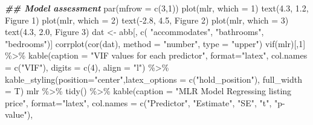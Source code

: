 \documentclass[
]{article}
\newenvironment{Shaded}{\begin{snugshade}}{\end{snugshade}}
\newcommand{\AttributeTok}[1]{\textcolor[rgb]{0.77,0.63,0.00}{#1}}
\newcommand{\DecValTok}[1]{\textcolor[rgb]{0.00,0.00,0.81}{#1}}
\newcommand{\DocumentationTok}[1]{\textcolor[rgb]{0.56,0.35,0.01}{\textbf{\textit{#1}}}}
\newcommand{\FloatTok}[1]{\textcolor[rgb]{0.00,0.00,0.81}{#1}}
\newcommand{\FunctionTok}[1]{\textcolor[rgb]{0.00,0.00,0.00}{#1}}
\newcommand{\NormalTok}[1]{#1}
\newcommand{\OtherTok}[1]{\textcolor[rgb]{0.56,0.35,0.01}{#1}}
\newcommand{\SpecialCharTok}[1]{\textcolor[rgb]{0.00,0.00,0.00}{#1}}
\newcommand{\StringTok}[1]{\textcolor[rgb]{0.31,0.60,0.02}{#1}}
\begin{document}
\begin{Shaded}
\begin{Highlighting}[]
\DocumentationTok{\#\# Model assessment}
\FunctionTok{par}\NormalTok{(}\AttributeTok{mfrow =} \FunctionTok{c}\NormalTok{(}\DecValTok{3}\NormalTok{,}\DecValTok{1}\NormalTok{))}
\FunctionTok{plot}\NormalTok{(mlr, }\AttributeTok{which =} \DecValTok{1}\NormalTok{)}
\FunctionTok{text}\NormalTok{(}\FloatTok{4.3}\NormalTok{, }\FloatTok{1.2}\NormalTok{, }\StringTok{\textquotesingle{}Figure 1\textquotesingle{}}\NormalTok{)}
\FunctionTok{plot}\NormalTok{(mlr, }\AttributeTok{which =} \DecValTok{2}\NormalTok{)}
\FunctionTok{text}\NormalTok{(}\SpecialCharTok{{-}}\FloatTok{2.8}\NormalTok{, }\FloatTok{4.5}\NormalTok{, }\StringTok{\textquotesingle{}Figure 2\textquotesingle{}}\NormalTok{)}
\FunctionTok{plot}\NormalTok{(mlr, }\AttributeTok{which =} \DecValTok{3}\NormalTok{)}
\FunctionTok{text}\NormalTok{(}\FloatTok{4.3}\NormalTok{, }\FloatTok{2.0}\NormalTok{, }\StringTok{\textquotesingle{}Figure 3\textquotesingle{}}\NormalTok{)}
\NormalTok{dat }\OtherTok{\textless{}{-}}\NormalTok{ abb[, }\FunctionTok{c}\NormalTok{( }\StringTok{"accommodates"}\NormalTok{, }\StringTok{"bathrooms"}\NormalTok{,  }\StringTok{"bedrooms"}\NormalTok{)]}
\FunctionTok{corrplot}\NormalTok{(}\FunctionTok{cor}\NormalTok{(dat), }\AttributeTok{method =} \StringTok{"number"}\NormalTok{, }\AttributeTok{type =} \StringTok{"upper"}\NormalTok{)}
\FunctionTok{vif}\NormalTok{(mlr)[,}\DecValTok{1}\NormalTok{] }\SpecialCharTok{\%\textgreater{}\%} 
  \FunctionTok{kable}\NormalTok{(}\AttributeTok{caption =} \StringTok{"VIF values for each predictor"}\NormalTok{,}
        \AttributeTok{format=}\StringTok{"latex"}\NormalTok{,}
        \AttributeTok{col.names =} \FunctionTok{c}\NormalTok{(}\StringTok{"VIF"}\NormalTok{),}
        \AttributeTok{digits =} \FunctionTok{c}\NormalTok{(}\DecValTok{4}\NormalTok{),}
        \AttributeTok{align =} \StringTok{"l"}\NormalTok{) }\SpecialCharTok{\%\textgreater{}\%} 
  \FunctionTok{kable\_styling}\NormalTok{(}\AttributeTok{position=}\StringTok{"center"}\NormalTok{,}\AttributeTok{latex\_options =} \FunctionTok{c}\NormalTok{(}\StringTok{"hold\_position"}\NormalTok{), }\AttributeTok{full\_width =}\NormalTok{ T)}
\NormalTok{mlr }\SpecialCharTok{\%\textgreater{}\%}
  \FunctionTok{tidy}\NormalTok{() }\SpecialCharTok{\%\textgreater{}\%} 
  \FunctionTok{kable}\NormalTok{(}\AttributeTok{caption =} \StringTok{"MLR Model Regressing listing price"}\NormalTok{,}
        \AttributeTok{format=}\StringTok{"latex"}\NormalTok{,}
        \AttributeTok{col.names =} \FunctionTok{c}\NormalTok{(}\StringTok{"Predictor"}\NormalTok{, }\StringTok{"Estimate"}\NormalTok{, }\StringTok{"SE"}\NormalTok{, }\StringTok{"t"}\NormalTok{, }\StringTok{"p{-}value"}\NormalTok{),}

\end{Highlighting}
\end{Shaded}
\end{document}
